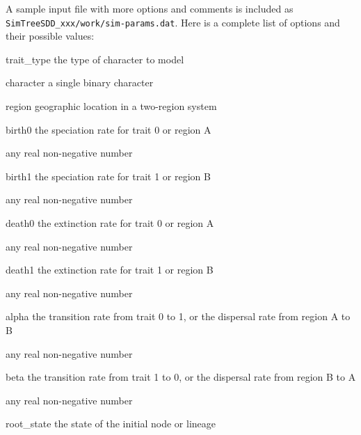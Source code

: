 \documentclass[10pt]{article}
\begin{document}
A sample input file with more options and comments is included as \texttt{SimTreeSDD\_xxx/work/sim-params.dat}.  
Here is a complete list of options and their possible values:
\begin{optdescrip}
	\item[trait\_type] the type of character to model
		\begin{valdescrip}
			\item[character] a single binary character
			\item[region] geographic location in a two-region system
		\end{valdescrip}
	\item[birth0] the speciation rate for trait 0 or region A
		\begin{valdescrip}
			\item[] any real non-negative number
		\end{valdescrip}
	\item[birth1] the speciation rate for trait 1 or region B
		\begin{valdescrip}
			\item[] any real non-negative number
		\end{valdescrip}
	\item[death0] the extinction rate for trait 0 or region A
		\begin{valdescrip}
			\item[] any real non-negative number
		\end{valdescrip}
	\item[death1] the extinction rate for trait 1 or region B
		\begin{valdescrip}
			\item[] any real non-negative number
		\end{valdescrip}
	\item[alpha] the transition rate from trait 0 to 1, or the dispersal rate from region A to B
		\begin{valdescrip}
			\item[] any real non-negative number
		\end{valdescrip}
	\item[beta] the transition rate from trait 1 to 0, or the dispersal rate from region B to A
		\begin{valdescrip}
			\item[] any real non-negative number
		\end{valdescrip}
	\item[root\_state] the state of the initial node or lineage
		\begin{valdescrip}

\end{valdescrip}
\end{optdescrip}
\end{document}
